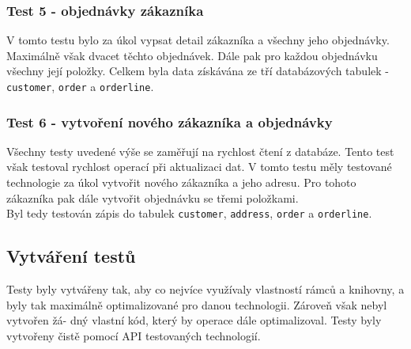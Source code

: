 \documentclass[ing,male,java,dept456]{diploma}						%
\begin{document}
\subsubsection{Test 5 - objednávky zákazníka}
V tomto testu bylo za úkol vypsat detail zákazníka a všechny jeho objednávky. Maximálně však dvacet těchto objednávek. Dále pak pro každou objednávku všechny její položky.
Celkem byla data získávána ze tří databázových tabulek - \lstinline[style=inlinepython]|customer|, \lstinline[style=inlinepython]|order| a \lstinline[style=inlinepython]|orderline|.

\subsubsection{Test 6 - vytvoření nového zákazníka a objednávky}
Všechny testy uvedené výše se zaměřují na rychlost čtení z databáze. Tento test však testoval rychlost operací při aktualizaci dat. V tomto testu měly testované technologie za úkol vytvořit nového zákazníka a jeho adresu. Pro tohoto zákazníka pak dále vytvořit objednávku se třemi položkami. \\
Byl tedy testován zápis do tabulek \lstinline[style=inlinepython]|customer|, \lstinline[style=inlinepython]|address|, \lstinline[style=inlinepython]|order| a \lstinline[style=inlinepython]|orderline|.

\subsection{Vytváření testů}
Testy byly vytvářeny tak, aby co nejvíce využívaly vlastností rámců a knihovny, a byly tak maximálně optimalizované pro danou technologii. Zároveň však nebyl vytvořen žá- dný vlastní kód, který by operace dále optimalizoval. Testy byly vytvořeny čistě pomocí API testovaných technologií. 
\end{document}

